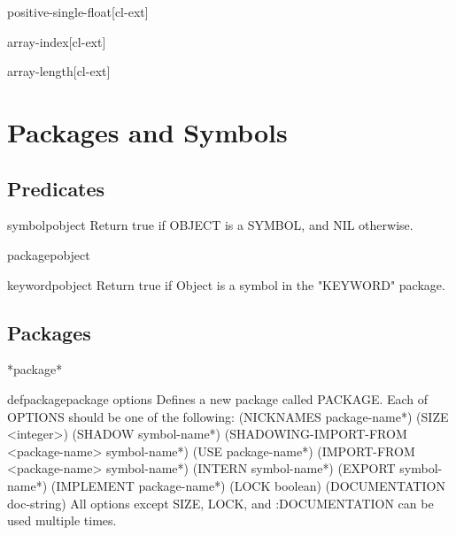 \documentclass[10pt,english]{book}
\begin{document}
\begin{type}{positive-single-float}{}[cl-ext]
  
\end{type}

\begin{type}{array-index}{}[cl-ext]
  
\end{type}

\begin{type}{array-length}{}[cl-ext]
  
\end{type}



\chapter{Packages and Symbols}
\label{cha:packages-symbols}

\section{Predicates}
\label{sec:predicates}

\begin{function}{symbolp}{object}
  Return true if OBJECT is a SYMBOL, and NIL otherwise.
\end{function}

\begin{function}{packagep}{object}
  
\end{function}

\begin{function}{keywordp}{object}
  Return true if Object is a symbol in the "KEYWORD" package.
\end{function}

\section{Packages}
\label{sec:packages}

\begin{variable}{*package*}{}
  
\end{variable}

\begin{macro}{defpackage}{package \rest options}
  Defines a new package called PACKAGE. Each of OPTIONS should be one of the
   following: 
    (NICKNAMES {package-name}*)
    (SIZE <integer>)
    (SHADOW {symbol-name}*)
    (SHADOWING-IMPORT-FROM <package-name> {symbol-name}*)
    (USE {package-name}*)
    (IMPORT-FROM <package-name> {symbol-name}*)
    (INTERN {symbol-name}*)
    (EXPORT {symbol-name}*)
    (IMPLEMENT {package-name}*)
    (LOCK boolean)
    (DOCUMENTATION doc-string)
   All options except SIZE, LOCK, and :DOCUMENTATION can be used multiple
   times.
\end{macro}
\end{document}
